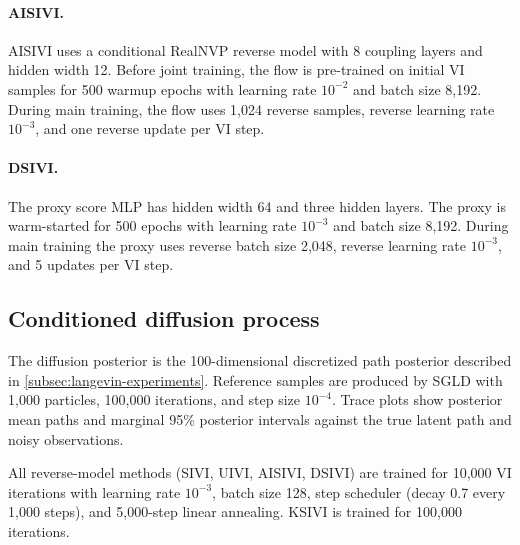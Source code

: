 \paragraph{AISIVI.}
AISIVI uses a conditional RealNVP reverse model with 8 coupling layers and hidden width 12.  Before joint training, the flow is pre-trained on initial VI samples for 500 warmup epochs with learning rate $10^{-2}$ and batch size 8,192.  During main training, the flow uses 1,024 reverse samples, reverse learning rate $10^{-3}$, and one reverse update per VI step.

\paragraph{DSIVI.}
The proxy score MLP has hidden width 64 and three hidden layers.  The proxy is warm-started for 500 epochs with learning rate $10^{-3}$ and batch size 8,192.  During main training the proxy uses reverse batch size 2,048, reverse learning rate $10^{-3}$, and 5 updates per VI step.





\subsection{Conditioned diffusion process}
\label{app:diffusion-details}

The diffusion posterior is the 100-dimensional discretized path posterior described in \cref{subsec:langevin-experiments}.  Reference samples are produced by SGLD with 1,000 particles, 100,000 iterations, and step size $10^{-4}$.  Trace plots show posterior mean paths and marginal 95\% posterior intervals against the true latent path and noisy observations.

All reverse-model methods (SIVI, UIVI, AISIVI, DSIVI) are trained for 10,000 VI iterations with learning rate $10^{-3}$, batch size 128, step scheduler (decay 0.7 every 1,000 steps), and 5,000-step linear annealing.  KSIVI is trained for 100,000 iterations.

